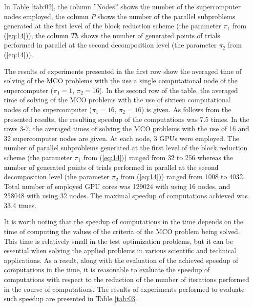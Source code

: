 \documentclass[runningheads]{llncs}
\begin{document}
In Table \ref{tab:02}, the column ''Nodes'' shows the number of the supercomputer nodes employed, the column $P$ shows the number of the parallel subproblems generated at the first level of the block reduction scheme (the parameter $\pi_1$ from (\ref{eq:14})), the column $Th$ shows the number of generated points of trials performed in parallel at the second decomposition level (the parameter $\pi_2$ from (\ref{eq:14})).

The results of experiments presented in the first row show the averaged time of solving of the MCO problems with the use a single computational node of the supercomputer ($\pi_1=1$, $\pi_2=16$). In the second row of the table, the averaged time of solving of the MCO problems with the use of sixteen computational nodes of the supercomputer ($\pi_1=16$, $\pi_2=16$) is given. As follows from the presented results, the resulting speedup of the computations was 7.5 times. In the rows 3-7, the averaged times of solving the MCO problems with the use of 16 and 32 supercomputer nodes are given. At each node, 3 GPUs were employed. The number of parallel subproblems generated at the first level of the block reduction scheme (the parameter $\pi_1$ from (\ref{eq:14})) ranged from 32 to 256 whereas the number of generated points of trials performed in parallel at the second decomposition level (the parameter $\pi_2$ from (\ref{eq:14})) ranged from 1008 to 4032. Total number of employed GPU cores was 129024 with using 16 nodes, and 258048 with using 32 nodes. The maximal speedup of computations achieved was 33.4 times.

It is worth noting that the speedup of computations in the time depends on the time of computing the values of the criteria of the MCO problem being solved. This time is relatively small in the test optimization problems, but it can be essential when solving the applied problems in various scientific and technical applications. As a result, along with the evaluation of the achieved speedup of computations in the time, it is reasonable to evaluate the speedup of computations with respect to the reduction of the number of iterations performed in the course of computations. The results of experiments performed to evaluate such speedup are presented in Table \ref{tab:03}.
\end{document}
